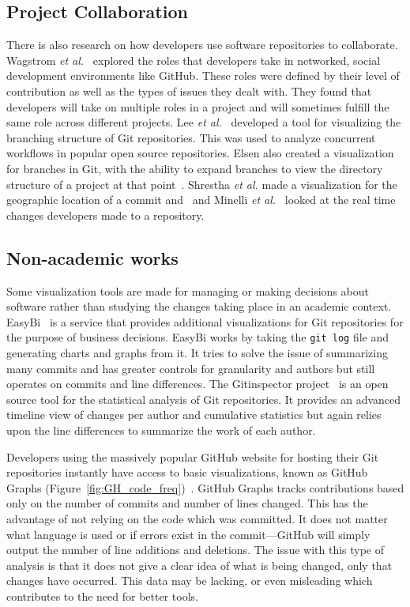 \subsection{Project Collaboration}

There is also research on how developers use software repositories to collaborate. Wagstrom \textit{et al.}~\cite{Patrick:Wagstrom:2012} explored the roles that developers take in networked, social development environments like GitHub. These roles were defined by their level of contribution as well as the types of issues they dealt with. They found that developers will take on multiple roles in a project and will sometimes fulfill the same role across different projects. Lee \textit{et al.}~\cite{lee2013} developed a tool for visualizing the branching structure of Git repositories. This was used to analyze concurrent workflows in popular open source repositories. Elsen also created a visualization for branches in Git, with the ability to expand branches to view the directory structure of a project at that point~\cite{6650522}.   Shrestha \textit{et al.} made a visualization for the geographic location of a commit and~\cite{6650532} and Minelli \textit{et al.}~\cite{6980226} looked at the real time changes developers made to a repository.

\subsection{Non-academic works}

Some visualization tools are made for managing or making decisions about software rather than studying the changes taking place in an academic context. EasyBi~\cite{EasyBi} is a service that provides additional visualizations for Git repositories for the purpose of business decisions. EasyBi works by taking the \texttt{git log} file and generating charts and graphs from it. It tries to solve the issue of summarizing many commits and has greater controls for granularity and authors but still operates on commits and line differences. The Gitinspector project~\cite{Gitinspector} is an open source tool for the statistical analysis of Git repositories. It provides an advanced timeline view of changes per author and cumulative statistics but again relies upon the line differences to summarize the work of each author.

Developers using the massively popular GitHub website for hosting their Git repositories instantly have access to basic visualizations, known as GitHub Graphs (Figure~\ref{fig:GH_code_freq})~\cite{github-graphs}. GitHub Graphs tracks contributions based only on the number of commits and number of lines changed. This has the advantage of not relying on the code which was committed. It does not matter what language is used or if errors exist in the commit---GitHub will simply output the number of line additions and deletions. The issue with this type of analysis is that it does not give a clear idea of what is being changed, only that changes have occurred. This data may be lacking, or even misleading which contributes to the need for better tools.


